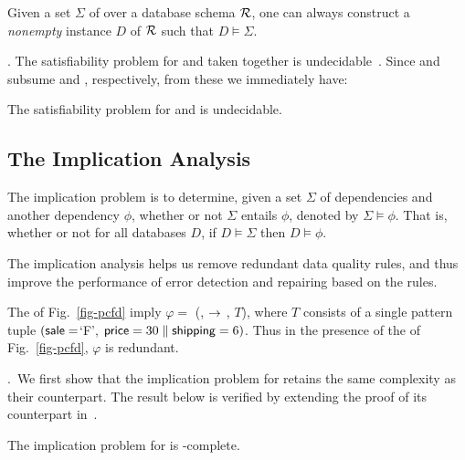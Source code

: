 \proofs Given a set $\Sigma$ of \pCINDs over a
database schema $\cal R$, one can always construct a
{\em nonempty} instance $D$ of $\cal R$ such that $D \models
\Sigma$. \eop
\vspace{0.5ex}


. The satisfiability problem for \CFDs
and \CINDs taken together is undecidable~\cite{CINDs}. Since \pCFDs and
\pCINDs subsume \CFDs and \CINDs, respectively, from these we
immediately have:

\vspace{-0.5ex}
\begin{cor}
\label{thm-sat-pcfd-pcind}The satisfiability problem for \pCFDs and
\pCINDs is undecidable.\eop
\end{cor}


\vspace{-3ex}
\subsection{The Implication Analysis}

The implication problem is to determine, given a set $\Sigma$ of
dependencies and another dependency $\phi$, whether or not
$\Sigma$ entails $\phi$, denoted by $\Sigma\models\phi$. That is,
whether or not for all databases $D$, if $D\models\Sigma$ then
$D\models\phi$.

The implication analysis helps us
remove redundant data quality rules, and thus improve the
performance of error detection and repairing based on
the rules.

\begin{example}
\label{exa-implication} The \pCFDs of Fig.~\ref{fig-pcfd} imply
\pCFDs $\varphi =$ (,  $\rightarrow$
, $T$), where $T$ consists of a single pattern tuple
$(\protect\mathsf{sale} = $`F', $\protect\mathsf{price} = 30 \parallel \protect\mathsf{shipping} = 6)$. Thus
in the presence of the \pCFDs of  Fig.~\ref{fig-pcfd}, $\varphi$ is
redundant. \eop
\end{example}
\vspace{-1ex}

.~We first show that
the implication problem for \pCFDs retains
the same complexity as their \CFDs counterpart. The result
below is verified by
extending the proof of its counterpart in~\cite{CFDs}.

\begin{prop}
\label{thm-imp-pcfd-fin}The implication problem for \pCFDs is
\coNP-complete. \eop
\end{prop}
\vspace{-1ex}

